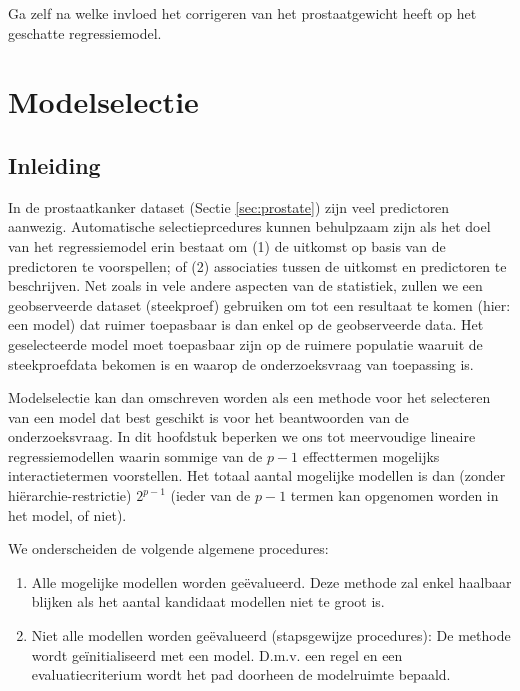 \documentclass[12pt,dutch,coursenotes]{book}
\theoremstyle{definition}
\theoremstyle{definition}
\theoremstyle{definition}
\theoremstyle{remark}
\begin{document}
Ga zelf na welke invloed het corrigeren van het prostaatgewicht heeft op
het geschatte regressiemodel.

\chapter{Modelselectie}\label{chap:modsel}

\section{Inleiding}\label{inleiding-9}

In de prostaatkanker dataset (Sectie \ref{sec:prostate}) zijn veel
predictoren aanwezig. Automatische selectieprcedures kunnen behulpzaam
zijn als het doel van het regressiemodel erin bestaat om (1) de uitkomst
op basis van de predictoren te voorspellen; of (2) associaties tussen de
uitkomst en predictoren te beschrijven. Net zoals in vele andere
aspecten van de statistiek, zullen we een geobserveerde dataset
(steekproef) gebruiken om tot een resultaat te komen (hier: een model)
dat ruimer toepasbaar is dan enkel op de geobserveerde data. Het
geselecteerde model moet toepasbaar zijn op de ruimere populatie waaruit
de steekproefdata bekomen is en waarop de onderzoeksvraag van toepassing
is.

Modelselectie kan dan omschreven worden als een methode voor het
selecteren van een model dat best geschikt is voor het beantwoorden van
de onderzoeksvraag. In dit hoofdstuk beperken we ons tot meervoudige
lineaire regressiemodellen waarin sommige van de \(p-1\) effecttermen
mogelijks interactietermen voorstellen. Het totaal aantal mogelijke
modellen is dan (zonder hiërarchie-restrictie) \(2^{p-1}\) (ieder van de
\(p-1\) termen kan opgenomen worden in het model, of niet).

We onderscheiden de volgende algemene procedures:

\begin{enumerate}
\def\labelenumi{\arabic{enumi}.}
\item
  Alle mogelijke modellen worden geëvalueerd. Deze methode zal enkel
  haalbaar blijken als het aantal kandidaat modellen niet te groot is.
\item
  Niet alle modellen worden geëvalueerd (stapsgewijze procedures): De
  methode wordt geïnitialiseerd met een model. D.m.v. een regel en een
  evaluatiecriterium wordt het pad doorheen de modelruimte bepaald.
\end{enumerate}
\end{document}
